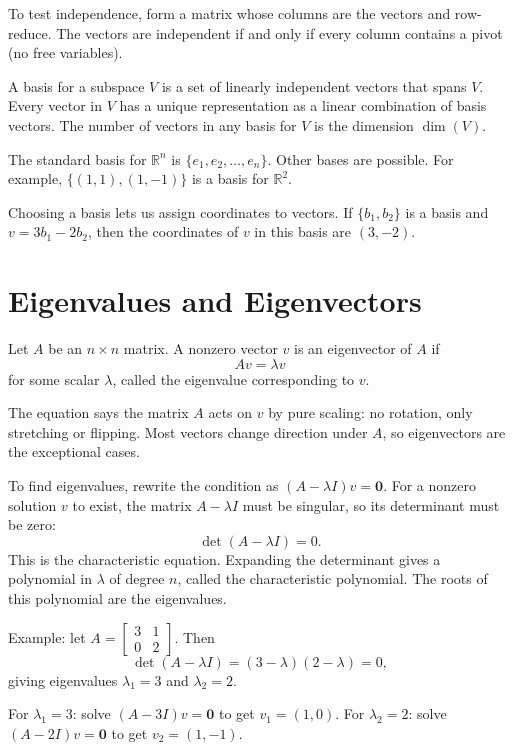 \documentclass[11pt]{article}
\begin{document}
To test independence, form a matrix whose columns are the vectors and row-reduce. The vectors are independent if and only if every column contains a pivot (no free variables).

A basis for a subspace $V$ is a set of linearly independent vectors that spans $V$. Every vector in $V$ has a unique representation as a linear combination of basis vectors. The number of vectors in any basis for $V$ is the dimension $\dim(V)$.

The standard basis for $\mathbb{R}^n$ is $\{e_1, e_2, \ldots, e_n\}$. Other bases are possible. For example, $\{(1,1), (1,-1)\}$ is a basis for $\mathbb{R}^2$.

Choosing a basis lets us assign coordinates to vectors. If $\{b_1, b_2\}$ is a basis and $v = 3b_1 - 2b_2$, then the coordinates of $v$ in this basis are $(3, -2)$.

\section*{Eigenvalues and Eigenvectors}

Let $A$ be an $n \times n$ matrix. A nonzero vector $v$ is an eigenvector of $A$ if
\[
Av = \lambda v
\]
for some scalar $\lambda$, called the eigenvalue corresponding to $v$.

The equation says the matrix $A$ acts on $v$ by pure scaling: no rotation, only stretching or flipping. Most vectors change direction under $A$, so eigenvectors are the exceptional cases.

To find eigenvalues, rewrite the condition as $(A - \lambda I)v = \mathbf{0}$. For a nonzero solution $v$ to exist, the matrix $A - \lambda I$ must be singular, so its determinant must be zero:
\[
\det(A - \lambda I) = 0.
\]
This is the characteristic equation. Expanding the determinant gives a polynomial in $\lambda$ of degree $n$, called the characteristic polynomial. The roots of this polynomial are the eigenvalues.

Example: let $A = \begin{bmatrix} 3 & 1 \\ 0 & 2 \end{bmatrix}$. Then
\[
\det(A - \lambda I) = (3 - \lambda)(2 - \lambda) = 0,
\]
giving eigenvalues $\lambda_1 = 3$ and $\lambda_2 = 2$.

For $\lambda_1 = 3$: solve $(A - 3I)v = \mathbf{0}$ to get $v_1 = (1, 0)$.
For $\lambda_2 = 2$: solve $(A - 2I)v = \mathbf{0}$ to get $v_2 = (1, -1)$.
\end{document}

